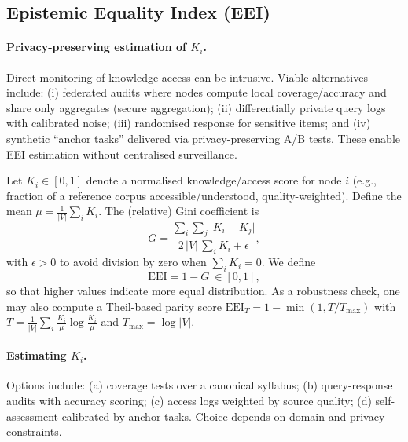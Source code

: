 \documentclass[12pt]{article}
\begin{document}
\subsection{Epistemic Equality Index (EEI)}
\paragraph{Privacy-preserving estimation of $K_i$.} Direct monitoring of knowledge access can be intrusive. Viable alternatives include: (i) federated audits where nodes compute local coverage/accuracy and share only aggregates (secure aggregation); (ii) differentially private query logs with calibrated noise; (iii) randomised response for sensitive items; and (iv) synthetic ``anchor tasks'' delivered via privacy-preserving A/B tests. These enable EEI estimation without centralised surveillance.

Let $K_i\in[0,1]$ denote a normalised knowledge/access score for node $i$ (e.g., fraction of a reference corpus accessible/understood, quality-weighted). Define the mean $\mu=\frac{1}{|V|}\sum_{i} K_i$. The (relative) Gini coefficient is
\begin{equation}
G=\frac{\sum_{i}\sum_{j}\lvert K_i-K_j\rvert}{2\,|V|\,\sum_{i} K_i+\epsilon},
\end{equation}
with $\epsilon\!>\!0$ to avoid division by zero when $\sum_i K_i=0$. We define
\begin{equation}
\mathrm{EEI}=1-G\ \in[0,1],
\end{equation}
so that higher values indicate more equal distribution. As a robustness check, one may also compute a Theil-based parity score $\mathrm{EEI}_T=1-\min(1,T/T_{\max})$ with $T=\frac{1}{|V|}\sum_i \frac{K_i}{\mu}\log\frac{K_i}{\mu}$ and $T_{\max}=\log |V|$.

\paragraph{Estimating $K_i$.} Options include: (a) coverage tests over a canonical syllabus; (b) query-response audits with accuracy scoring; (c) access logs weighted by source quality; (d) self-assessment calibrated by anchor tasks. Choice depends on domain and privacy constraints.
\end{document}

